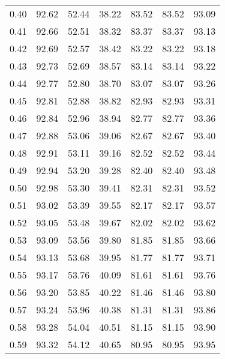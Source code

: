 \begin{tabular}{|c|c|c|c|c|c|c|}
      0.40 &     92.62 &     52.44 &      38.22 &   83.52 &      83.52 &         93.09 \\
      0.41 &     92.66 &     52.51 &      38.32 &   83.37 &      83.37 &         93.13 \\
      0.42 &     92.69 &     52.57 &      38.42 &   83.22 &      83.22 &         93.18 \\
      0.43 &     92.73 &     52.69 &      38.57 &   83.14 &      83.14 &         93.22 \\
      0.44 &     92.77 &     52.80 &      38.70 &   83.07 &      83.07 &         93.26 \\
      0.45 &     92.81 &     52.88 &      38.82 &   82.93 &      82.93 &         93.31 \\
      0.46 &     92.84 &     52.96 &      38.94 &   82.77 &      82.77 &         93.36 \\
      0.47 &     92.88 &     53.06 &      39.06 &   82.67 &      82.67 &         93.40 \\
      0.48 &     92.91 &     53.11 &      39.16 &   82.52 &      82.52 &         93.44 \\
      0.49 &     92.94 &     53.20 &      39.28 &   82.40 &      82.40 &         93.48 \\
      0.50 &     92.98 &     53.30 &      39.41 &   82.31 &      82.31 &         93.52 \\
      0.51 &     93.02 &     53.39 &      39.55 &   82.17 &      82.17 &         93.57 \\
      0.52 &     93.05 &     53.48 &      39.67 &   82.02 &      82.02 &         93.62 \\
      0.53 &     93.09 &     53.56 &      39.80 &   81.85 &      81.85 &         93.66 \\
      0.54 &     93.13 &     53.68 &      39.95 &   81.77 &      81.77 &         93.71 \\
      0.55 &     93.17 &     53.76 &      40.09 &   81.61 &      81.61 &         93.76 \\
      0.56 &     93.20 &     53.85 &      40.22 &   81.46 &      81.46 &         93.80 \\
      0.57 &     93.24 &     53.96 &      40.38 &   81.31 &      81.31 &         93.86 \\
      0.58 &     93.28 &     54.04 &      40.51 &   81.15 &      81.15 &         93.90 \\
      0.59 &     93.32 &     54.12 &      40.65 &   80.95 &      80.95 &         93.95 \\

\end{tabular}
